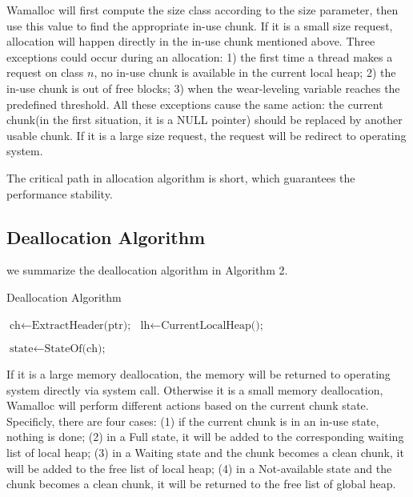 \documentclass{vldb}
\begin{document}
Wamalloc will first compute the size class according to the size parameter, 
then use this value to find the appropriate in-use chunk.
If it is a small size request, allocation will happen directly in the in-use chunk mentioned above.
Three exceptions could occur during an allocation:
1) the first time a thread makes a request on class $n$, no in-use chunk is available in the current local heap;
2) the in-use chunk is out of free blocks;
3) when the wear-leveling variable reaches the predefined threshold.
All these exceptions cause the same action: the current chunk(in the first situation, it is a NULL pointer) should be replaced by another usable chunk.
If it is a large size request, the request will be redirect to operating system.

The critical path in allocation algorithm is short, which guarantees the performance stability.

\subsection{Deallocation Algorithm}

we summarize the deallocation algorithm in Algorithm 2.

\begin{algorithm}
\caption{Deallocation Algorithm}\label{euclid}
\begin{algorithmic}[1]

\State $\text{ch} \gets \text{ExtractHeader(ptr);}$
\State $\text{lh} \gets \text{CurrentLocalHeap();}$

\State {}
\Else
\State {}
\State $\text{state} \gets \text{StateOf(ch);}$

    \State {}
    \State {}
        \State {}
    \EndIf
{}
        \State {}
    \EndIf
\Else
    \State {}
\EndIf
\EndIf

\EndProcedure
\end{algorithmic}
\end{algorithm}

If it is a large memory deallocation, the memory will be returned to operating system directly via system call.
Otherwise it is a small memory deallocation, Wamalloc will perform different actions based on the current chunk state.
Specificly, there are four cases:
(1) if the current chunk is in an in-use state, nothing is done;
(2) in a Full state, it will be added to the corresponding waiting list of local heap;
(3) in a Waiting state and the chunk becomes a clean chunk, it will be added to the free list of local heap;
(4) in a Not-available state and the chunk becomes a clean chunk, it will be returned to the free list of global heap.
\end{document}
